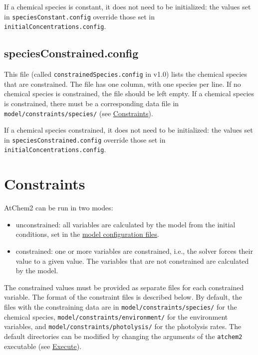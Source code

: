 If a chemical species is constant, it does not need to be initialized:
the values set in \texttt{speciesConstant.config} override those set
in \texttt{initialConcentrations.config}.

\subsection{speciesConstrained.config} \label{subsec:speciesconstrained}

This file (called \texttt{constrainedSpecies.config} in v1.0) lists
the chemical species that are constrained. The file has one column,
with one species per line. If no chemical species is constrained, the
file should be left empty. If a chemical species is constrained, there
must be a corresponding data file in
\texttt{model/constraints/species/} (see
\hyperref[sec:constraints]{Constraints}).

If a chemical species constrained, it does not need to be initialized:
the values set in \texttt{speciesConstrained.config} override those
set in \texttt{initialConcentrations.config}.

\section{Constraints} \label{sec:constraints}

AtChem2 can be run in two modes:

\begin{itemize}
\item unconstrained: all variables are calculated by the model from
  the initial conditions, set in the \hyperref[sec:config-files]{model
    configuration files}.
\item constrained: one or more variables are constrained, i.e., the
  solver forces their value to a given value. The variables that are
  not constrained are calculated by the model.
\end{itemize}

The constrained values must be provided as separate files for each
constrained variable. The format of the constraint files is described
below. By default, the files with the constraining data are in
\texttt{model/constraints/species/} for the chemical species,
\texttt{model/constraints/environment/} for the environment variables,
and \texttt{model/constraints/photolysis/} for the photolysis
rates. The default directories can be modified by changing the
arguments of the \texttt{atchem2} executable (see
\hyperref[sec:execute]{Execute}).

